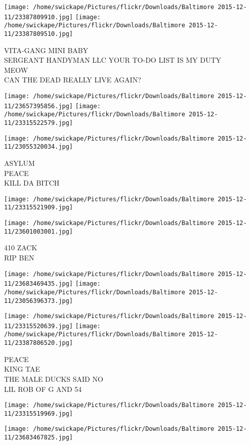 \documentclass[10pt,letterpaper]{article}
\begin{document}
\texttt{[image: /home/swickape/Pictures/flickr/Downloads/Baltimore 2015-12-11/23387809910.jpg]}
\texttt{[image: /home/swickape/Pictures/flickr/Downloads/Baltimore 2015-12-11/23387809510.jpg]}

VITA{-}GANG MINI BABY\\
SERGEANT HANDYMAN LLC YOUR TO{-}DO LIST IS MY DUTY\\
MEOW\\
CAN THE DEAD REALLY LIVE AGAIN?
\pagebreak

\texttt{[image: /home/swickape/Pictures/flickr/Downloads/Baltimore 2015-12-11/23657395856.jpg]}
\texttt{[image: /home/swickape/Pictures/flickr/Downloads/Baltimore 2015-12-11/23315522579.jpg]}

\vspace{0.25in}
\texttt{[image: /home/swickape/Pictures/flickr/Downloads/Baltimore 2015-12-11/23055320034.jpg]}

ASYLUM\\
PEACE\\
KILL DA BITCH
\pagebreak

\texttt{[image: /home/swickape/Pictures/flickr/Downloads/Baltimore 2015-12-11/23315521909.jpg]}

\vspace{0.25in}
\texttt{[image: /home/swickape/Pictures/flickr/Downloads/Baltimore 2015-12-11/23601003001.jpg]}

410 ZACK\\
RIP BEN
\pagebreak

\texttt{[image: /home/swickape/Pictures/flickr/Downloads/Baltimore 2015-12-11/23683469435.jpg]}
\texttt{[image: /home/swickape/Pictures/flickr/Downloads/Baltimore 2015-12-11/23056396373.jpg]}

\texttt{[image: /home/swickape/Pictures/flickr/Downloads/Baltimore 2015-12-11/23315520639.jpg]}
\texttt{[image: /home/swickape/Pictures/flickr/Downloads/Baltimore 2015-12-11/23387806520.jpg]}

PEACE\\
KING TAE\\
THE MALE DUCKS SAID NO\\
LIL ROB OF G AND 54
\pagebreak

\texttt{[image: /home/swickape/Pictures/flickr/Downloads/Baltimore 2015-12-11/23315519969.jpg]}

\vspace{0.25in}
\texttt{[image: /home/swickape/Pictures/flickr/Downloads/Baltimore 2015-12-11/23683467825.jpg]}
\end{document}
